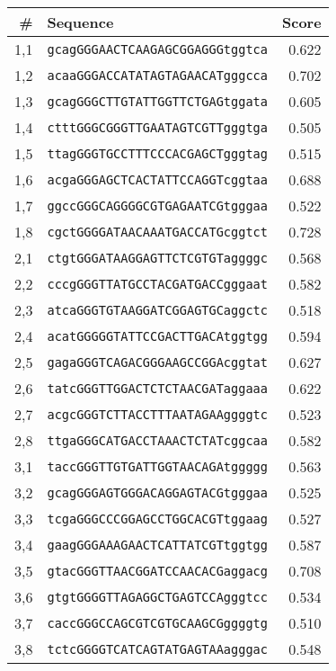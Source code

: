 \begin{tabular}{rlr}
\toprule
\# & Sequence & Score \\
\midrule
1,1 & \texttt{gcagGGGAACTCAAGAGCGGAGGGtggtca} & 0.622 \\
1,2 & \texttt{acaaGGGACCATATAGTAGAACATgggcca} & 0.702 \\
1,3 & \texttt{gcagGGGCTTGTATTGGTTCTGAGtggata} & 0.605 \\
1,4 & \texttt{ctttGGGCGGGTTGAATAGTCGTTgggtga} & 0.505 \\
1,5 & \texttt{ttagGGGTGCCTTTCCCACGAGCTgggtag} & 0.515 \\
1,6 & \texttt{acgaGGGAGCTCACTATTCCAGGTcggtaa} & 0.688 \\
1,7 & \texttt{ggccGGGCAGGGGCGTGAGAATCGtgggaa} & 0.522 \\
1,8 & \texttt{cgctGGGGATAACAAATGACCATGcggtct} & 0.728 \\
2,1 & \texttt{ctgtGGGATAAGGAGTTCTCGTGTaggggc} & 0.568 \\
2,2 & \texttt{cccgGGGTTATGCCTACGATGACCgggaat} & 0.582 \\
2,3 & \texttt{atcaGGGTGTAAGGATCGGAGTGCaggctc} & 0.518 \\
2,4 & \texttt{acatGGGGGTATTCCGACTTGACAtggtgg} & 0.594 \\
2,5 & \texttt{gagaGGGTCAGACGGGAAGCCGGAcggtat} & 0.627 \\
2,6 & \texttt{tatcGGGTTGGACTCTCTAACGATaggaaa} & 0.622 \\
2,7 & \texttt{acgcGGGTCTTACCTTTAATAGAAggggtc} & 0.523 \\
2,8 & \texttt{ttgaGGGCATGACCTAAACTCTATcggcaa} & 0.582 \\
3,1 & \texttt{taccGGGTTGTGATTGGTAACAGAtggggg} & 0.563 \\
3,2 & \texttt{gcagGGGAGTGGGACAGGAGTACGtgggaa} & 0.525 \\
3,3 & \texttt{tcgaGGGCCCGGAGCCTGGCACGTtggaag} & 0.527 \\
3,4 & \texttt{gaagGGGAAAGAACTCATTATCGTtggtgg} & 0.587 \\
3,5 & \texttt{gtacGGGTTAACGGATCCAACACGaggacg} & 0.708 \\
3,6 & \texttt{gtgtGGGGTTAGAGGCTGAGTCCAgggtcc} & 0.534 \\
3,7 & \texttt{caccGGGCCAGCGTCGTGCAAGCGggggtg} & 0.510 \\
3,8 & \texttt{tctcGGGGTCATCAGTATGAGTAAagggac} & 0.548 \\

\bottomrule
\end{tabular}